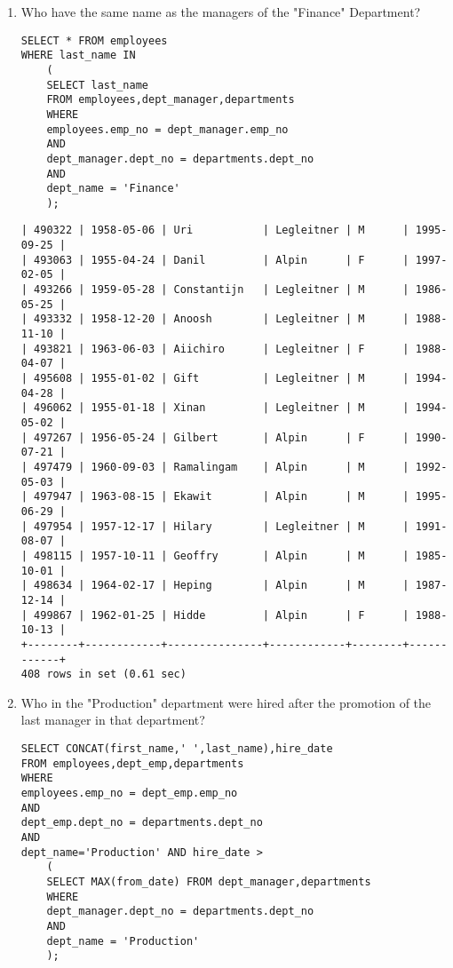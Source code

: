 \documentclass[]{article}
\begin{document}
\begin{enumerate}

\item Who have the same name as the managers of the "Finance" Department?

\begin{verbatim}
SELECT * FROM employees 
WHERE last_name IN
	(
	SELECT last_name
	FROM employees,dept_manager,departments
	WHERE 
	employees.emp_no = dept_manager.emp_no
	AND
	dept_manager.dept_no = departments.dept_no
	AND
	dept_name = 'Finance'
	);
\end{verbatim}

\begin{verbatim}
| 490322 | 1958-05-06 | Uri           | Legleitner | M      | 1995-09-25 |
| 493063 | 1955-04-24 | Danil         | Alpin      | F      | 1997-02-05 |
| 493266 | 1959-05-28 | Constantijn   | Legleitner | M      | 1986-05-25 |
| 493332 | 1958-12-20 | Anoosh        | Legleitner | M      | 1988-11-10 |
| 493821 | 1963-06-03 | Aiichiro      | Legleitner | F      | 1988-04-07 |
| 495608 | 1955-01-02 | Gift          | Legleitner | M      | 1994-04-28 |
| 496062 | 1955-01-18 | Xinan         | Legleitner | M      | 1994-05-02 |
| 497267 | 1956-05-24 | Gilbert       | Alpin      | F      | 1990-07-21 |
| 497479 | 1960-09-03 | Ramalingam    | Alpin      | M      | 1992-05-03 |
| 497947 | 1963-08-15 | Ekawit        | Alpin      | M      | 1995-06-29 |
| 497954 | 1957-12-17 | Hilary        | Legleitner | M      | 1991-08-07 |
| 498115 | 1957-10-11 | Geoffry       | Alpin      | M      | 1985-10-01 |
| 498634 | 1964-02-17 | Heping        | Alpin      | M      | 1987-12-14 |
| 499867 | 1962-01-25 | Hidde         | Alpin      | F      | 1988-10-13 |
+--------+------------+---------------+------------+--------+------------+
408 rows in set (0.61 sec)
\end{verbatim}

\item Who in the "Production" department were hired after the promotion of the last manager in that department?

\begin{verbatim}
SELECT CONCAT(first_name,' ',last_name),hire_date
FROM employees,dept_emp,departments
WHERE
employees.emp_no = dept_emp.emp_no
AND
dept_emp.dept_no = departments.dept_no
AND
dept_name='Production' AND hire_date > 
	(
	SELECT MAX(from_date) FROM dept_manager,departments
	WHERE
	dept_manager.dept_no = departments.dept_no
	AND
	dept_name = 'Production'
	);
\end{verbatim}


\end{enumerate}
\end{document}
